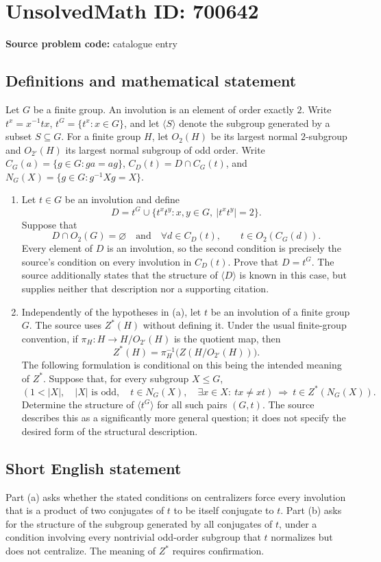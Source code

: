 \documentclass[11pt]{article}
\begin{document}
\section*{UnsolvedMath ID: 700642}
\textbf{Source problem code:} catalogue entry
\subsection{Definitions and mathematical statement}
Let \(G\) be a finite group. An involution is an element of order exactly \(2\). Write \(t^x=x^{-1}tx\), \(t^G=\{t^x:x\in G\}\), and let \(\langle S\rangle\) denote the subgroup generated by a subset \(S\subseteq G\). For a finite group \(H\), let \(O_2(H)\) be its largest normal \(2\)-subgroup and \(O_{2'}(H)\) its largest normal subgroup of odd order. Write \(C_G(a)=\{g\in G:ga=ag\}\), \(C_D(t)=D\cap C_G(t)\), and \(N_G(X)=\{g\in G:g^{-1}Xg=X\}\).

\begin{enumerate}
\item[(a)] Let \(t\in G\) be an involution and define
\[
D=t^G\cup\{t^xt^y:x,y\in G,\ |t^xt^y|=2\}.
\]
Suppose that
\[
D\cap O_2(G)=\varnothing
\quad\text{and}\quad
\forall d\in C_D(t),\qquad t\in O_2(C_G(d)).
\]
Every element of \(D\) is an involution, so the second condition is precisely the source's condition on every involution in \(C_D(t)\). Prove that \(D=t^G\). The source additionally states that the structure of \(\langle D\rangle\) is known in this case, but supplies neither that description nor a supporting citation.

\item[(b)] Independently of the hypotheses in (a), let \(t\) be an involution of a finite group \(G\). The source uses \(Z^*(H)\) without defining it. Under the usual finite-group convention, if \(\pi_H:H\to H/O_{2'}(H)\) is the quotient map, then
\[
Z^*(H)=\pi_H^{-1}\bigl(Z(H/O_{2'}(H))\bigr).
\]
The following formulation is conditional on this being the intended meaning of \(Z^*\). Suppose that, for every subgroup \(X\leq G\),
\[
\left(1<|X|,\quad |X|\text{ is odd},\quad t\in N_G(X),\quad
\exists x\in X:\ tx\ne xt\right)
\ \Longrightarrow\ 
t\in Z^*(N_G(X)).
\]
Determine the structure of \(\langle t^G\rangle\) for all such pairs \((G,t)\). The source describes this as a significantly more general question; it does not specify the desired form of the structural description.
\end{enumerate}
\subsection{Short English statement}
Part (a) asks whether the stated conditions on centralizers force every involution that is a product of two conjugates of \(t\) to be itself conjugate to \(t\). Part (b) asks for the structure of the subgroup generated by all conjugates of \(t\), under a condition involving every nontrivial odd-order subgroup that \(t\) normalizes but does not centralize. The meaning of \(Z^*\) requires confirmation.
\end{document}
